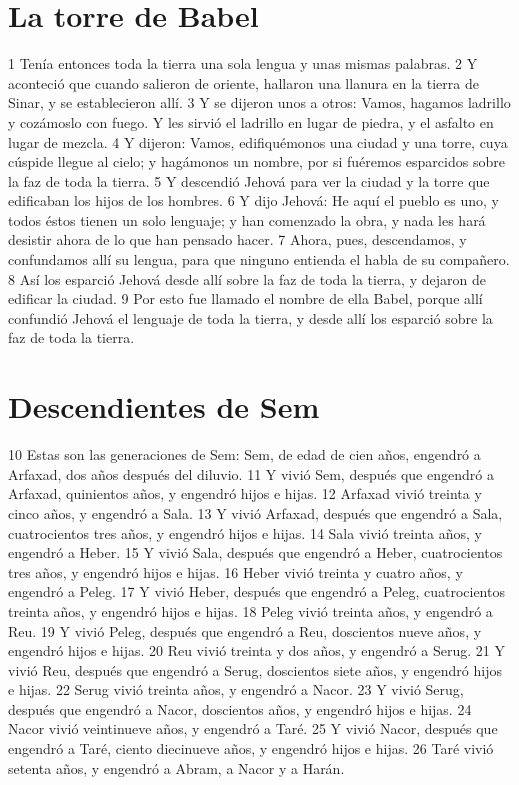 \section*{La torre de Babel}

1 Tenía entonces toda la tierra una sola lengua y unas mismas palabras.
2 Y aconteció que cuando salieron de oriente, hallaron una llanura en la tierra de Sinar, y se establecieron allí.
3 Y se dijeron unos a otros: Vamos, hagamos ladrillo y cozámoslo con fuego. Y les sirvió el ladrillo en lugar de piedra, y el asfalto en lugar de mezcla.
4 Y dijeron: Vamos, edifiquémonos una ciudad y una torre, cuya cúspide llegue al cielo; y hagámonos un nombre, por si fuéremos esparcidos sobre la faz de toda la tierra.
5 Y descendió Jehová para ver la ciudad y la torre que edificaban los hijos de los hombres.
6 Y dijo Jehová: He aquí el pueblo es uno, y todos éstos tienen un solo lenguaje; y han comenzado la obra, y nada les hará desistir ahora de lo que han pensado hacer.
7 Ahora, pues, descendamos, y confundamos allí su lengua, para que ninguno entienda el habla de su compañero.
8 Así los esparció Jehová desde allí sobre la faz de toda la tierra, y dejaron de edificar la ciudad.
9 Por esto fue llamado el nombre de ella Babel, porque allí confundió Jehová el lenguaje de toda la tierra, y desde allí los esparció sobre la faz de toda la tierra.

\section*{Descendientes de Sem}

10 Estas son las generaciones de Sem: Sem, de edad de cien años, engendró a Arfaxad, dos años después del diluvio.
11 Y vivió Sem, después que engendró a Arfaxad, quinientos años, y engendró hijos e hijas.
12 Arfaxad vivió treinta y cinco años, y engendró a Sala.
13 Y vivió Arfaxad, después que engendró a Sala, cuatrocientos tres años, y engendró hijos e hijas.
14 Sala vivió treinta años, y engendró a Heber.
15 Y vivió Sala, después que engendró a Heber, cuatrocientos tres años, y engendró hijos e hijas.
16 Heber vivió treinta y cuatro años, y engendró a Peleg.
17 Y vivió Heber, después que engendró a Peleg, cuatrocientos treinta años, y engendró hijos e hijas.
18 Peleg vivió treinta años, y engendró a Reu.
19 Y vivió Peleg, después que engendró a Reu, doscientos nueve años, y engendró hijos e hijas.
20 Reu vivió treinta y dos años, y engendró a Serug.
21 Y vivió Reu, después que engendró a Serug, doscientos siete años, y engendró hijos e hijas.
22 Serug vivió treinta años, y engendró a Nacor.
23 Y vivió Serug, después que engendró a Nacor, doscientos años, y engendró hijos e hijas.
24 Nacor vivió veintinueve años, y engendró a Taré.
25 Y vivió Nacor, después que engendró a Taré, ciento diecinueve años, y engendró hijos e hijas.
26 Taré vivió setenta años, y engendró a Abram, a Nacor y a Harán.

